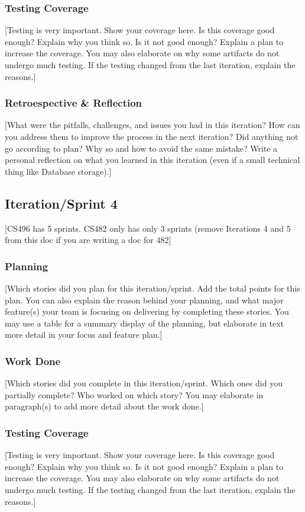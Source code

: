 \documentclass{article}
\begin{document}
\subsubsection{Testing Coverage}
[Testing is very important. Show your coverage here. Is this coverage good enough? Explain why you think so. Is it not good enough? Explain a plan to increase the coverage. You may also elaborate on why some artifacts do not undergo much testing. If the testing changed from the last iteration, explain the reasons.]

\subsubsection{Retroespective \& Reflection}
[What were the pitfalls, challenges, and issues you had in this iteration? How can you address them to improve the process in the next iteration? Did anything not go according to plan? Why so and how to avoid the same mistake? Write a personal reflection on what you learned in this iteration (even if a small technical thing like Database storage).]

\subsection{Iteration/Sprint 4}
[CS496 has 5 sprints. CS482 only has only 3 sprints (remove Iterations 4 and 5 from this doc if you are writing a doc for 482]

\subsubsection{Planning}
[Which stories did you plan for this iteration/sprint. Add the total points for this plan. You can also explain the reason behind your planning, and what major feature(s) your team is focusing on delivering by completing these stories. You may use a table for a summary display of the planning, but elaborate in text more detail in your focus and feature plan.]

\subsubsection{Work Done}
[Which stories did you complete in this iteration/sprint. Which ones did you partially complete? Who worked on which story? You may elaborate in paragraph(s) to add more detail about the work done.]

\subsubsection{Testing Coverage}
[Testing is very important. Show your coverage here. Is this coverage good enough? Explain why you think so. Is it not good enough? Explain a plan to increase the coverage. You may also elaborate on why some artifacts do not undergo much testing. If the testing changed from the last iteration, explain the reasons.]
\end{document}
